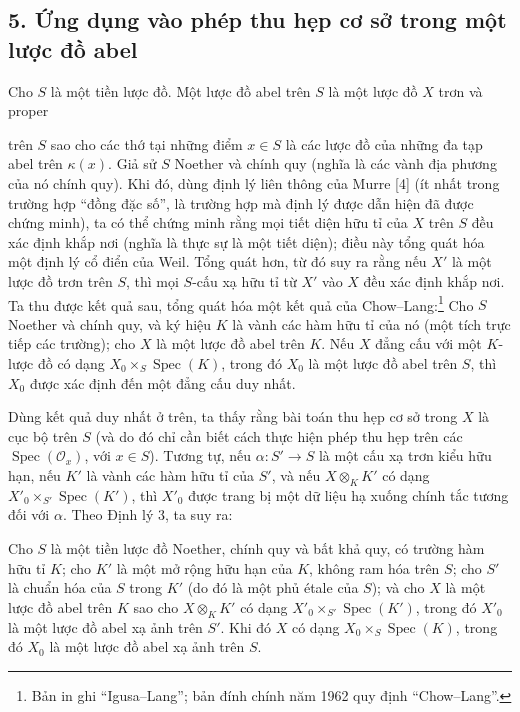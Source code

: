 \subsection*{5. Ứng dụng vào phép thu hẹp cơ sở trong một lược đồ abel}

Cho $S$ là một tiền lược đồ. Một lược đồ abel trên $S$ là một lược đồ $X$ trơn
và proper

trên $S$ sao cho các thớ tại những điểm $x\in S$ là các lược đồ của những đa
tạp abel trên $\kappa(x)$. Giả sử $S$ Noether và chính quy (nghĩa là các vành
địa phương của nó chính quy). Khi đó, dùng định lý liên thông của Murre [4]
(ít nhất trong trường hợp ``đồng đặc số'', là trường hợp mà định lý được dẫn
hiện đã được chứng minh), ta có thể chứng minh rằng mọi tiết diện hữu tỉ của
$X$ trên $S$ đều xác định khắp nơi (nghĩa là thực sự là một tiết diện); điều
này tổng quát hóa một định lý cổ điển của Weil. Tổng quát hơn, từ đó suy ra
rằng nếu $X'$ là một lược đồ trơn trên $S$, thì mọi $S$-cấu xạ hữu tỉ từ $X'$
vào $X$ đều xác định khắp nơi. Ta thu được kết quả sau, tổng quát hóa một kết
quả của Chow--Lang:\footnote{Bản in ghi ``Igusa--Lang''; bản đính chính năm
1962 quy định ``Chow--Lang''.} Cho $S$ Noether và chính quy, và ký hiệu $K$ là
vành các hàm hữu tỉ của nó (một tích trực tiếp các trường); cho $X$ là một lược
đồ abel trên $K$. Nếu $X$ đẳng cấu với một $K$-lược đồ có dạng
$X_0\times_S\operatorname{Spec}(K)$, trong đó $X_0$ là một lược đồ abel trên
$S$, thì $X_0$ được xác định đến một đẳng cấu duy nhất.

Dùng kết quả duy nhất ở trên, ta thấy rằng bài toán thu hẹp cơ sở trong $X$ là
cục bộ trên $S$ (và do đó chỉ cần biết cách thực hiện phép thu hẹp trên các
$\operatorname{Spec}(\mathcal O_x)$, với $x\in S$). Tương tự, nếu
$\alpha:S'\longrightarrow S$ là một cấu xạ trơn kiểu hữu hạn, nếu $K'$ là
vành các hàm hữu tỉ của $S'$, và nếu $X\otimes_KK'$ có dạng
$X'_0\times_{S'}\operatorname{Spec}(K')$, thì $X'_0$ được trang bị một dữ liệu
hạ xuống chính tắc tương đối với $\alpha$. Theo Định lý 3, ta suy ra:

 Cho $S$ là một tiền lược đồ Noether, chính quy và bất khả
quy, có trường hàm hữu tỉ $K$; cho $K'$ là một mở rộng hữu hạn của $K$, không
ram hóa trên $S$; cho $S'$ là chuẩn hóa của $S$ trong $K'$ (do đó là một phủ
étale của $S$); và cho $X$ là một lược đồ abel trên $K$ sao cho
$X\otimes_KK'$ có dạng $X'_0\times_{S'}\operatorname{Spec}(K')$, trong đó
$X'_0$ là một lược đồ abel xạ ảnh trên $S'$. Khi đó $X$ có dạng
$X_0\times_S\operatorname{Spec}(K)$, trong đó $X_0$ là một lược đồ abel xạ ảnh
trên $S$.


